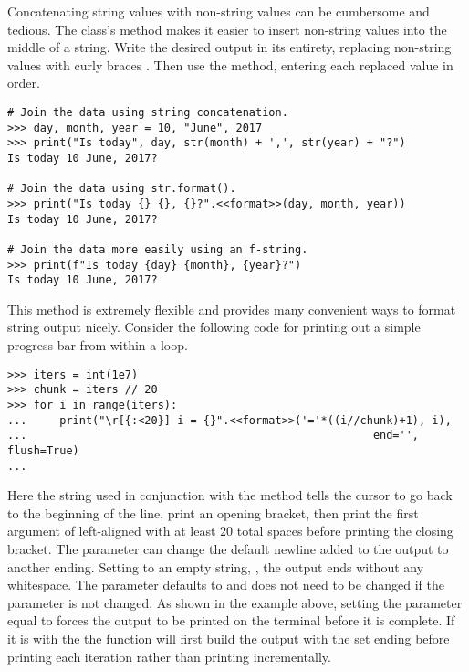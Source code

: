 Concatenating string values with non-string values can be cumbersome and tedious.
The  class's  method makes it easier to insert non-string values into the middle of a string.
Write the desired output in its entirety, replacing non-string values with curly braces \li{\{\}}.
Then use the  method, entering each replaced value in order.

\begin{lstlisting}
# Join the data using string concatenation.
>>> day, month, year = 10, "June", 2017
>>> print("Is today", day, str(month) + ',', str(year) + "?")
Is today 10 June, 2017?

# Join the data using str.format().
>>> print("Is today {} {}, {}?".<<format>>(day, month, year))
Is today 10 June, 2017?

# Join the data more easily using an f-string.
>>> print(f"Is today {day} {month}, {year}?")
Is today 10 June, 2017?
\end{lstlisting}

This method is extremely flexible and provides many convenient ways to format string output nicely.
Consider the following code for printing out a simple progress bar from within a loop.

\begin{lstlisting}
>>> iters = int(1e7)
>>> chunk = iters // 20
>>> for i in range(iters):
...     print("\r[{:<20}] i = {}".<<format>>('='*((i//chunk)+1), i),
...                                                     end='', flush=True)
...
\end{lstlisting}

Here the string  used in conjunction with the  method tells the cursor to go back to the beginning of the line, print an opening bracket, then print the first argument of  left-aligned with at least $20$ total spaces before printing the closing bracket. The   parameter can change the default newline added to the output to another ending. Setting to an empty string, , the output ends without any whitespace. The  parameter defaults to   and does not need to be changed if the   parameter is not changed. As shown in the example above, setting the parameter equal to  forces the output to be printed on the terminal before it is complete. If it is  with the   the  function will first build the output with the set ending before printing each iteration rather than printing incrementally. 

